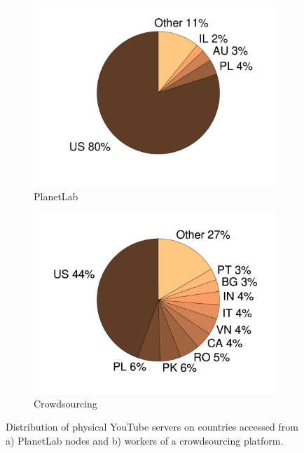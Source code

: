 \begin{figure}[bt]
    \centering
	\begin{subfigure}[t]{0.49\textwidth}
	\includegraphics[width=\textwidth]{aslevel/crowd/results/figs/PLDest.pdf}
  \caption{PlanetLab}
	\label{fig:PLDst}
  \end{subfigure}
	\begin{subfigure}[t]{0.49\textwidth}
	\includegraphics[width=\textwidth]{aslevel/crowd/results/figs/MWDest.pdf}
  \caption{Crowdsourcing}
 	\label{fig:MWDst}
  \end{subfigure}
    \caption{Distribution of physical YouTube servers on countries accessed from a) PlanetLab nodes and b) workers of a crowdsourcing platform.}
    \label{fig:Dst}
\end{figure}

